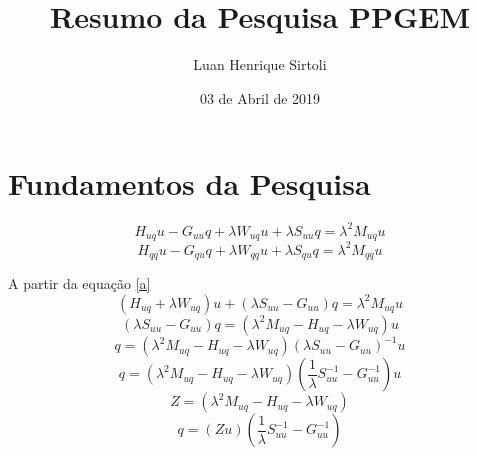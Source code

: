 \documentclass[a4paper,12p]{article}
\begin{document}
	\title{\LARGE{\textbf{Resumo da Pesquisa PPGEM}}}
	\author{Luan Henrique Sirtoli}
	\date{03 de Abril de 2019}
	\maketitle


	\setcounter{page}{1}

	\section{Fundamentos da Pesquisa}

	\begin{equation}
	H_{uq}u - G_{uu}q + \lambda W_{uq}u + \lambda S_{uu}q = \lambda^2 M_{uq}u \label{a}
	\end{equation}
	\begin{equation}
	H_{qq}u - G_{qu}q + \lambda W_{qq}u + \lambda S_{qu}q = \lambda^2 M_{qq}u
	\end{equation}
	
	A partir da equação \ref{a}
	\begin{equation}
	(H_{uq}  + \lambda W_{uq})u + (\lambda S_{uu} - G_{uu})q = \lambda^2 M_{uq}u
	\end{equation}
	\begin{equation}
	 (\lambda S_{uu} - G_{uu})q = (\lambda^2 M_{uq} - H_{uq}  - \lambda W_{uq})u
	\end{equation}
	\begin{equation}
	q = (\lambda^2 M_{uq} - H_{uq}  - \lambda W_{uq})(\lambda S_{uu} - G_{uu})^{-1}u 
	\end{equation}
	\begin{equation}
	q = (\lambda^2 M_{uq} - H_{uq}  - \lambda W_{uq})(\frac{1}{\lambda} S_{uu}^{-1} - G_{uu}^{-1})u 
	\end{equation}
	\begin{equation}
	Z = (\lambda^2 M_{uq} - H_{uq}  - \lambda W_{uq})
	\end{equation}
	\begin{equation}
	q = (Zu)(\frac{1}{\lambda} S_{uu}^{-1} - G_{uu}^{-1}) 
	\end{equation}
	
	
	
\end{document}
